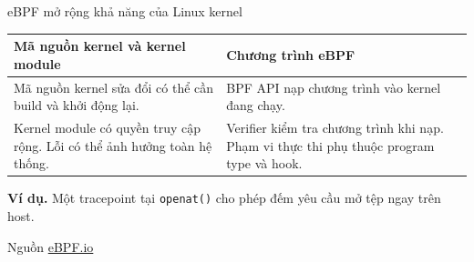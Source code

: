 \begin{frame}{eBPF mở rộng khả năng của Linux kernel}
  \small
  \centering
  \renewcommand{\arraystretch}{1.45}
  \begin{tabular}{@{}L{0.44\textwidth}L{0.48\textwidth}@{}}
    \toprule
    \textbf{Mã nguồn kernel và kernel module} & \textbf{Chương trình eBPF} \\
    \midrule
    Mã nguồn kernel sửa đổi có thể cần build và khởi động lại.
      & BPF API nạp chương trình vào kernel đang chạy. \\
    Kernel module có quyền truy cập rộng. Lỗi có thể ảnh hưởng toàn hệ thống.
      & Verifier kiểm tra chương trình khi nạp. Phạm vi thực thi phụ thuộc program type và hook. \\
    \bottomrule
  \end{tabular}

  \medskip
  \textbf{Ví dụ.} Một tracepoint tại \texttt{openat()} cho phép đếm yêu cầu mở tệp ngay trên host.

  \smallskip
  {\scriptsize Nguồn \href{https://ebpf.io/what-is-ebpf/}{eBPF.io}}
\end{frame}
